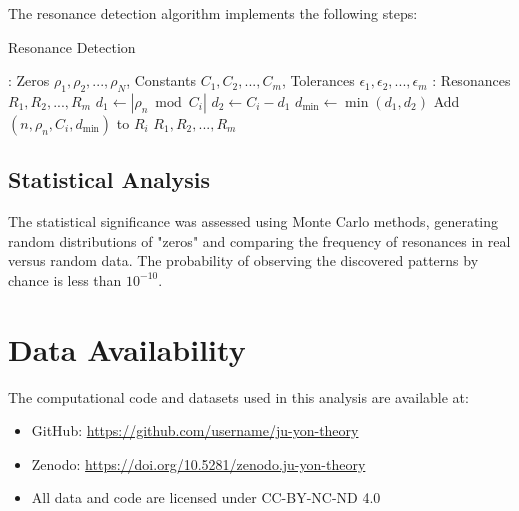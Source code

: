 \documentclass[12pt, a4paper]{article}
\begin{document}
The resonance detection algorithm implements the following steps:

\begin{algorithm}[H]
\caption{Resonance Detection}
\begin{algorithmic}
\Require: Zeros $\rho_1, \rho_2, ..., \rho_N$, Constants $C_1, C_2, ..., C_m$, Tolerances $\epsilon_1, \epsilon_2, ..., \epsilon_m$
\Ensure: Resonances $R_1, R_2, ..., R_m$
        $d_1 \gets |\rho_n \bmod C_i|$
        $d_2 \gets C_i - d_1$
        $d_{\min} \gets \min(d_1, d_2)$
            Add $(n, \rho_n, C_i, d_{\min})$ to $R_i$
        \EndIf
    \EndFor
\EndFor
\EndFor
\Return $R_1, R_2, ..., R_m$
\end{algorithmic}
\end{algorithm}

\subsection{Statistical Analysis}

The statistical significance was assessed using Monte Carlo methods, generating random distributions of "zeros" and comparing the frequency of resonances in real versus random data. The probability of observing the discovered patterns by chance is less than $10^{-10}$.

\section{Data Availability}

The computational code and datasets used in this analysis are available at:
\begin{itemize}
\item GitHub: \url{https://github.com/username/ju-yon-theory}
\item Zenodo: \url{https://doi.org/10.5281/zenodo.ju-yon-theory}
\item All data and code are licensed under CC-BY-NC-ND 4.0
\end{itemize}
\end{document}

